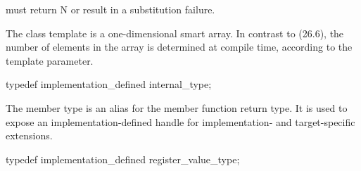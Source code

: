 \begin{wgText}
\begin{itemdescr}
    \pnum
     must return \code N or result in a substitution failure.
  \end{itemdescr}

  

  The class template \datapar{} is a one-dimensional smart array.
  In contrast to  (26.6), the number of elements in the array is determined at compile time, according to the  template parameter.

  \begin{itemdecl}
    typedef implementation_defined internal_type;
  \end{itemdecl}
  \begin{itemdescr}
    \pnum
    The  member type is an alias for the  member function return type.
    It is used to expose an implementation-defined handle for implementation- and target-specific extensions.
  \end{itemdescr}

  \begin{itemdecl}
    typedef implementation_defined register_value_type;
  \end{itemdecl}
  \begin{itemdescr}
  \end{itemdescr}

  \begin{itemdecl}
  \end{itemdecl}
  \begin{itemdescr}
  \end{itemdescr}

  \begin{itemdecl}
  \end{itemdecl}
  \begin{itemdescr}
  \end{itemdescr}

  \begin{itemdecl}
  \end{itemdecl}
  \begin{itemdescr}
  \end{itemdescr}

  \begin{itemdecl}
  \end{itemdecl}
  \begin{itemdescr}
  \end{itemdescr}

  

\end{wgText}
